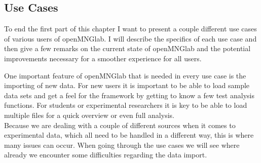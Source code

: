 \subsection{Use Cases}
To end the first part of this chapter I want to present a couple different use cases of various users of openMNGlab. I will describe the specifics of each use case and then give a few remarks on the current state of openMNGlab and the potential improvements necessary for a smoother experience for all users.

One important feature of openMNGlab that is needed in every use case is the importing of new data. For new users it is important to be able to load sample data sets and get a feel for the framework by getting to know a few test analysis functions. For students or experimental researchers it is key to be able to load multiple files for a quick overview or even full analysis.\\
Because we are dealing with a couple of different sources when it comes to experimental data, which all need to be handled in a different way, this is where many issues can occur. When going through the use cases we will see where already we encounter some difficulties regarding the data import.

